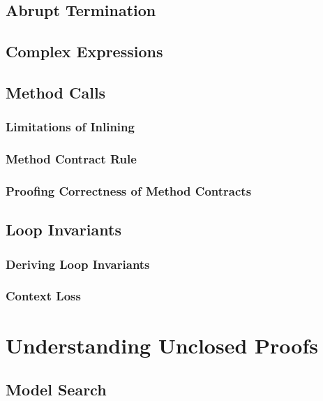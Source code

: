 \documentclass[a4paper, 11pt, accentcolor = tud3b]{tudreport}
\begin{document}
			\subsection{Abrupt Termination} %

			\subsection{Complex Expressions} %

			\subsection{Method Calls} %

				\subsubsection{Limitations of Inlining} %

				\subsubsection{Method Contract Rule} %

				\subsubsection{Proofing Correctness of Method Contracts} %

			\subsection{Loop Invariants} %

				\subsubsection{Deriving Loop Invariants} %

				\subsubsection{Context Loss} %

		\section{Understanding Unclosed Proofs} %

			\subsection{Model Search} %
\end{document}
